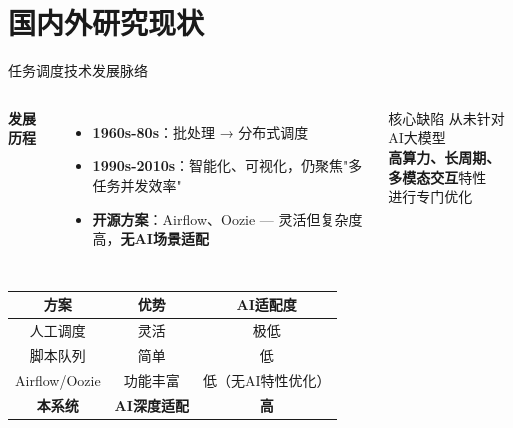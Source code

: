\documentclass[aspectratio=169,UTF8,xcolor=table]{ctexbeamer}
\begin{document}
\section{国内外研究现状}

\begin{frame}{任务调度技术发展脉络}
  \begin{columns}[T]
    \textbf{发展历程}
    \begin{itemize}
      \item \textbf{1960s-80s}：批处理 → 分布式调度
      \item \textbf{1990s-2010s}：智能化、可视化，仍聚焦"多任务并发效率"
      \item \textbf{开源方案}：Airflow、Oozie — 灵活但复杂度高，\textbf{无AI场景适配}
    \end{itemize}

    \begin{exampleblock}{核心缺陷}
      从未针对AI大模型\\
      \textbf{高算力、长周期、}\\
      \textbf{多模态交互}特性\\
      进行专门优化
    \end{exampleblock}
  \end{columns}

  \vspace{0.4cm}
  \begin{center}
    \begin{tabular}{|c|c|c|}
      \hline
      \textbf{方案} & \textbf{优势} & \textbf{AI适配度} \\
      \hline
      人工调度 & 灵活 & 极低 \\
      \hline
      脚本队列 & 简单 & 低 \\
      \hline
      Airflow/Oozie & 功能丰富 & 低（无AI特性优化）\\
      \hline
      \textcolor{ustcblue}{\textbf{本系统}} & \textbf{AI深度适配} & \textbf{高} \\
      \hline
    \end{tabular}
  \end{center}
\end{frame}
\end{document}
